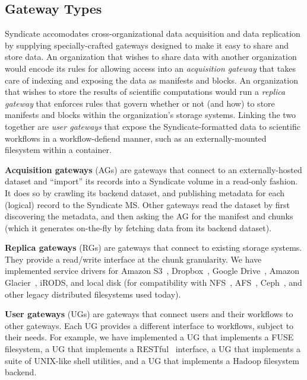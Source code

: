 \subsection{Gateway Types}

Syndicate accomodates cross-organizational data acquisition and
data replication by supplying specially-crafted gateways designed to make it
easy to share and store data.  An organization that wishes to share data with
another organization would encode its rules for allowing access into an
\emph{acquisition gateway} that takes care of indexing and exposing the data as
manifests and blocks.  An organization that wishes to store the results of
scientific computations would run a \emph{replica gateway} that enforces rules
that govern whether or not (and how) to store manifests and blocks within the
organization's storage systems.  Linking the two together are \emph{user
gateways} that expose the Syndicate-formatted data to scientific workflows in a
workflow-defiend manner, such as an externally-mounted filesystem within a
container.

\textbf{Acquisition gateways} (AGs) are gateways that connect to an externally-hosted
dataset and ``import'' its records into a Syndicate volume in a read-only
fashion.  It does so by crawling its backend dataset, and publishing metadata
for each (logical) record to the Syndicate MS.  Other gateways read the dataset
by first discovering the metadata, and then asking the AG for the manifest and
chunks (which it generates on-the-fly by fetching data from its backend
dataset).

\textbf{Replica gateways} (RGs) are gateways that connect to existing storage
systems.  They provide a read/write interface at the chunk granularity.  We have
implemented service drivers for Amazon S3~\cite{s3}, Dropbox~\cite{dropbox},
Google Drive~\cite{google-drive}, Amazon Glacier~\cite{amazon-glacier}, iRODS,
and local disk (for compatibility with NFS~\cite{nfs}, AFS~\cite{afs},
Ceph~\cite{ceph}, and other legacy distributed filesystems used today).

\textbf{User gateways} (UGs) are gateways that connect users and their workflows
to other gateways.  Each UG provides a different interface to workflows, subject
to their needs.  For example, we have implemented a UG that implements a
FUSE~\cite{fuse} filesystem, a UG that implements a RESTful~\cite{rest}
interface, a UG that implements a suite of UNIX-like shell utilities, and a UG
that implements a Hadoop filesystem~\cite{hadoop} backend.

